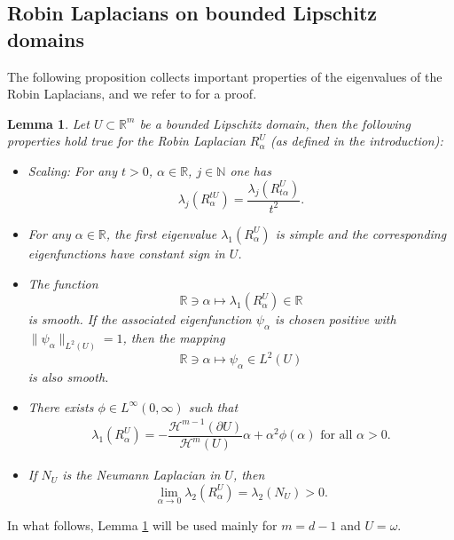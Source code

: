 \documentclass[11pt,oneside,reqno,a4paper]{amsart}
\newcommand{\N}{\mathbb{N}}
\newcommand{\R}{\mathbb{R}}
\renewcommand{\H}{\mathcal{H}}
\newtheorem{lemma}[theorem]{Lemma}
\theoremstyle{definition}
\begin{document}
	\subsection{Robin Laplacians on bounded Lipschitz domains}\label{secrobin}

	The following proposition collects important properties of the eigenvalues of the Robin Laplacians, and we refer to \cite[Lemma 2.1]{vogel} for a proof.
	
	\begin{lemma}\label{basic properties}
		Let $U\subset\R^m$ be a bounded Lipschitz domain,
		then the following properties hold true for the Robin Laplacian $R^U_\alpha$ (as defined in the introduction):
		\begin{itemize}
			
			\item[(i)]Scaling: For any $t>0$, $\alpha\in\R$, $j\in\N$ one has
			\[
			\lambda_j(R^{tU}_\alpha)=\dfrac{\lambda_j(R^{U}_{t\alpha})}{t^2}.
			\]
			
			\item[(ii)] For any $\alpha\in\R$, the first eigenvalue $\lambda_1(R^{U}_{\alpha})$
				is simple and the corresponding eigenfunctions have constant sign in $U$.
				
			\item[(iii)] The function
			\[
			\R\ni\alpha\mapsto\lambda_1(R^U_\alpha)\in\R
			\]
			is smooth. If the associated eigenfunction $\psi_\alpha$ is chosen positive with $\|\psi_\alpha\|_{L^2(U)}=1$, then the mapping
			\[
			\R\ni\alpha\mapsto \psi_\alpha\in L^2(U)
			\]
			is also smooth.

			\item[(iv)]
			
			 There exists $\phi\in L^{\infty}(0,\infty)$ such that
\begin{gather*}
\lambda_1(R^{U}_{\alpha})=-\dfrac{\H^{m-1}(\partial U)}{\H^m(U)}\alpha+\alpha^2\phi(\alpha)\text{ for all }\alpha>0.
\end{gather*}
			
			\item[(v)] If $N_U$ is the Neumann Laplacian in $U$, then
			\[
			\lim_{\alpha\to0}\lambda_2(R^{U}_{\alpha})=\lambda_2(N_U)>0.
			\]
			
			
		\end{itemize}
	\end{lemma}
	
In what follows, Lemma \ref{basic properties} will be used mainly for $m=d-1$ and $U=\omega$.
	
\end{document}

